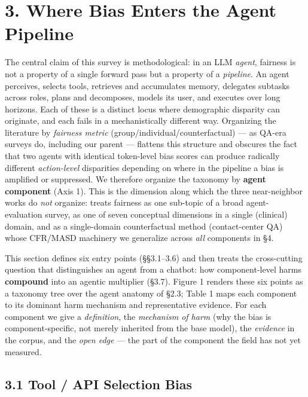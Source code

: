 \documentclass[sigconf,nonacm]{acmart}
\begin{document}
\section{3. Where Bias Enters the Agent Pipeline}

The central claim of this survey is methodological: in an LLM \emph{agent}, fairness is not a property of a single forward pass but a property of a \emph{pipeline}. An agent perceives, selects tools, retrieves and accumulates memory, delegates subtasks across roles, plans and decomposes, models its user, and executes over long horizons. Each of these is a distinct locus where demographic disparity can originate, and each fails in a mechanistically different way. Organizing the literature by \emph{fairness metric} (group/individual/counterfactual) — as QA-era surveys do, including our parent \cite{chu2024fairness} — flattens this structure and obscures the fact that two agents with identical token-level bias scores can produce radically different \emph{action-level} disparities depending on where in the pipeline a bias is amplified or suppressed. We therefore organize the taxonomy by \textbf{agent component} (Axis 1). This is the dimension along which the three near-neighbor works do \emph{not} organize: \cite{mohammadi2025evaluation} treats fairness as one sub-topic of a broad agent-evaluation survey, \cite{vatsal2026agentic} as one of seven conceptual dimensions in a single (clinical) domain, and \cite{mayilvaghanan2026counterfactual} as a single-domain counterfactual method (contact-center QA) whose CFR/MASD machinery we generalize across \emph{all} components in §4.

This section defines six entry points (§§3.1–3.6) and then treats the cross-cutting question that distinguishes an agent from a chatbot: how component-level harms \textbf{compound} into an agentic multiplier (§3.7). Figure 1 renders these six points as a taxonomy tree over the agent anatomy of §2.3; Table 1 maps each component to its dominant harm mechanism and representative evidence. For each component we give a \emph{definition}, the \emph{mechanism of harm} (why the bias is component-specific, not merely inherited from the base model), the \emph{evidence} in the corpus, and the \emph{open edge} — the part of the component the field has not yet measured.

\subsection{3.1 Tool / API Selection Bias}
\end{document}
